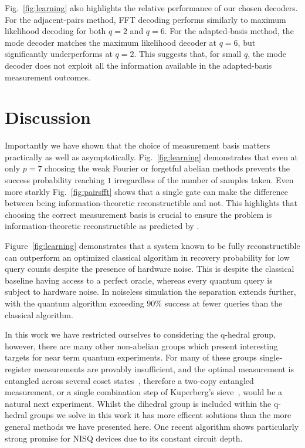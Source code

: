 \documentclass[aps,floatfix,10pt,amssymb,amsfont,amsmath,superscriptaddress,float,nofootinbib,longbibliography,nobalancelastpage,twocolumn]{revtex4-2}
\begin{document}
Fig.~\ref{fig:learning} also highlights the relative performance of our chosen decoders. For the adjacent-pairs method, FFT decoding performs similarly to maximum likelihood decoding for both $q=2$ and $q=6$. For the adapted-basis method, the mode decoder matches the maximum likelihood decoder at $q=6$, but significantly underperforms at $q=2$. This suggests that, for small $q$, the mode decoder does not exploit all the information available in the adapted-basis measurement outcomes.

\section{Discussion}
\label{section:discussion}
Importantly we have shown that the choice of measurement basis matters practically as well as asymptotically. Fig.~\ref{fig:learning} demonstrates that even at only $p=7$ choosing the weak Fourier or forgetful abelian methods prevents the success probability reaching $1$ irregardless of the number of samples taken. Even more starkly Fig.~\ref{fig:pairsfft} shows that a single gate can make the difference between being information-theoretic reconstructible and not. This highlights that choosing the correct measurement basis is crucial to ensure the problem is information-theoretic reconstructible as predicted by \cite{moore2007power}.

Figure~\ref{fig:learning} demonstrates that a system known to be fully reconstructible can outperform an optimized classical algorithm in recovery probability for low query counts despite the presence of hardware noise. This is despite the classical baseline having access to a perfect oracle, whereas every quantum query is subject to hardware noise. In noiseless simulation the separation extends further, with the quantum algorithm exceeding $90\%$ success at fewer queries than the classical algorithm.

In this work we have restricted ourselves to considering the q-hedral group, however, there are many other non-abelian groups which present interesting targets for near term quantum experiments. For many of these groups single-register measurements are provably insufficient, and the optimal measurement is entangled across several coset states~\cite{ettinger2004quantum,bacon2005optimal,hallgren2010limitations}, therefore a two-copy entangled measurement, or a single combination step of Kuperberg's sieve~\cite{kuperberg2005subexponential}, would be a natural next experiment. Whilst the dihedral group is included within the q-hedral groups we solve in this work it has more efficent solutions than the more general methods we have presented here. One recent algorithm \cite{lee2025learning} shows particularly strong promise for NISQ devices due to its constant circuit depth.
\end{document}
